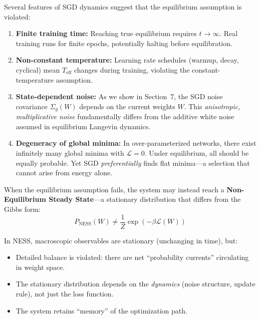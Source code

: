 \documentclass[
  journal=largetwo,
  year=2025,
  volume=37,
]{cup-journal}
\begin{document}
\begin{remark}\label{rmk:non_equilibrium}
Several features of SGD dynamics suggest that the equilibrium assumption is violated:

\begin{enumerate}
    \item \textbf{Finite training time:} Reaching true equilibrium requires $t \to \infty$. Real training runs for finite epochs, potentially halting before equilibration.
    
    \item \textbf{Non-constant temperature:} Learning rate schedules (warmup, decay, cyclical) mean $T_{\text{eff}}$ changes during training, violating the constant-temperature assumption.
    
    \item \textbf{State-dependent noise:} As we show in Section~7, the SGD noise covariance $\Sigma_g(W)$ depends on the current weights $W$. This \textit{anisotropic, multiplicative noise} fundamentally differs from the additive white noise assumed in equilibrium Langevin dynamics.
    
    \item \textbf{Degeneracy of global minima:} In over-parameterized networks, there exist infinitely many global minima with $\mathcal{L} = 0$. Under equilibrium, all should be equally probable. Yet SGD \textit{preferentially} finds flat minima---a selection that cannot arise from energy alone.
\end{enumerate}
\end{remark}

\begin{definition}\label{def:ness}
When the equilibrium assumption fails, the system may instead reach a \textbf{Non-Equilibrium Steady State}---a stationary distribution that differs from the Gibbs form:
\begin{equation}
    P_{\text{NESS}}(W) \neq \frac{1}{Z} \exp(-\beta \mathcal{L}(W))
\end{equation}

In NESS, macroscopic observables are stationary (unchanging in time), but:
\begin{itemize}
    \item Detailed balance is violated: there are net ``probability currents'' circulating in weight space.
    \item The stationary distribution depends on the \textit{dynamics} (noise structure, update rule), not just the loss function.
    \item The system retains ``memory'' of the optimization path.
\end{itemize}
\end{definition}
\end{document}
